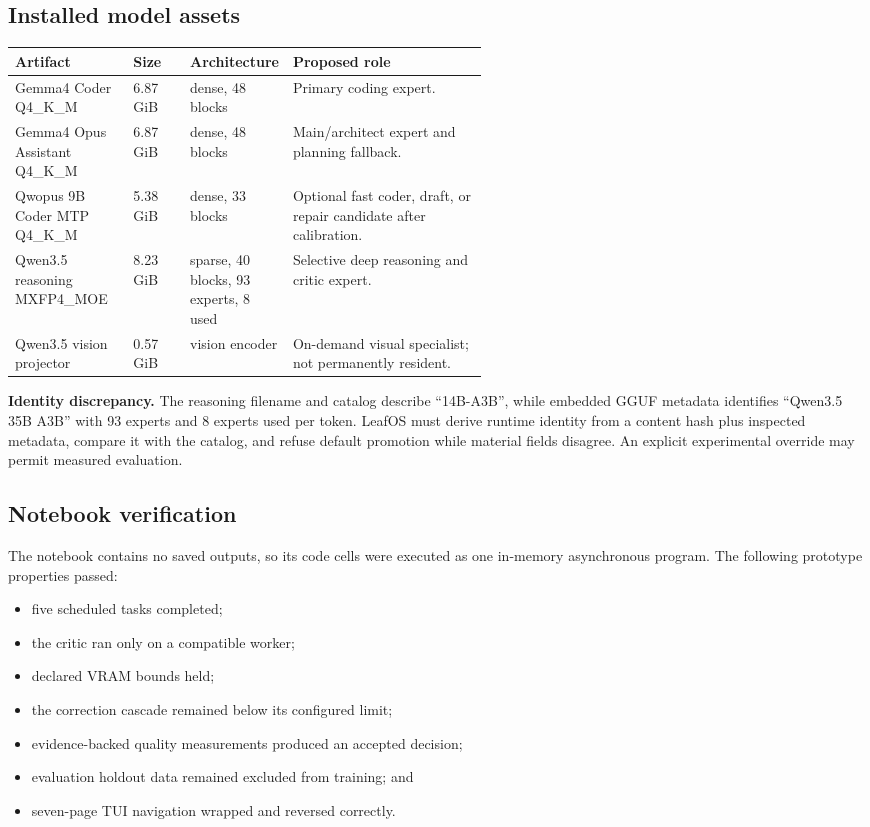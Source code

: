 \documentclass[11pt,letterpaper]{article}
\newcommand{\risk}[1]{\textcolor{leafred}{\textbf{#1}}}
\begin{document}
\subsection{Installed model assets}

\begin{tabularx}{\linewidth}{@{}L{0.25\linewidth}L{0.12\linewidth}L{0.18\linewidth}Y@{}}
\toprule
\textbf{Artifact} & \textbf{Size} & \textbf{Architecture} & \textbf{Proposed role} \\
\midrule
Gemma4 Coder Q4\_K\_M &
6.87 GiB & dense, 48 blocks & Primary coding expert. \\
Gemma4 Opus Assistant Q4\_K\_M &
6.87 GiB & dense, 48 blocks & Main/architect expert and planning fallback. \\
Qwopus 9B Coder MTP Q4\_K\_M &
5.38 GiB & dense, 33 blocks & Optional fast coder, draft, or repair candidate after calibration. \\
Qwen3.5 reasoning MXFP4\_MOE &
8.23 GiB & sparse, 40 blocks, 93 experts, 8 used & Selective deep reasoning and critic expert. \\
Qwen3.5 vision projector &
0.57 GiB & vision encoder & On-demand visual specialist; not permanently resident. \\
\bottomrule
\end{tabularx}

\risk{Identity discrepancy.} The reasoning filename and catalog describe
``14B-A3B'', while embedded GGUF metadata identifies
``Qwen3.5 35B A3B'' with 93 experts and 8 experts used per token. LeafOS must
derive runtime identity from a content hash plus inspected metadata, compare it
with the catalog, and refuse default promotion while material fields disagree.
An explicit experimental override may permit measured evaluation.

\subsection{Notebook verification}

The notebook contains no saved outputs, so its code cells were executed as one
in-memory asynchronous program. The following prototype properties passed:

\begin{itemize}
  \item five scheduled tasks completed;
  \item the critic ran only on a compatible worker;
  \item declared VRAM bounds held;
  \item the correction cascade remained below its configured limit;
  \item evidence-backed quality measurements produced an accepted decision;
  \item evaluation holdout data remained excluded from training; and
  \item seven-page TUI navigation wrapped and reversed correctly.
\end{itemize}
\end{document}
